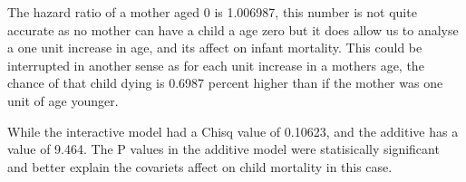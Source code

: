 \documentclass[12pt,letterpaper]{article}
\begin{document}


The hazard ratio of a mother aged 0 is 1.006987, this number is not quite accurate as no mother can have a child a age zero but it does allow us to analyse a one unit increase in age, and its affect on infant mortality. This could be interrupted in another sense as for each unit increase in a mothers age, the chance of that child dying is 0.6987 percent higher than if the mother was one unit of age younger. 
\vspace{.25cm}


While the interactive model had a Chisq value of 0.10623, and the additive has a value of 9.464. The P values in the additive model were statisically significant and better explain the covariets affect on child mortality in this case. 
\end{document}
